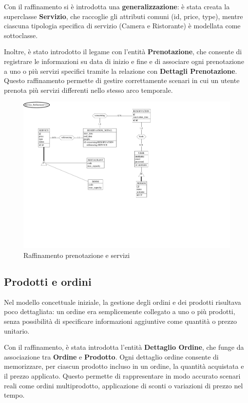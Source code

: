 \documentclass[a4paper,12pt]{report}
\begin{document}
\vspace{\baselineskip}
Con il raffinamento si è introdotta una \textbf{generalizzazione}: è stata creata la superclasse 
\textbf{Servizio}, che raccoglie gli attributi comuni (id, price, type), mentre ciascuna 
tipologia specifica di servizio (Camera e Ristorante) è modellata come sottoclasse.

\vspace{\baselineskip}
Inoltre, è stato introdotto il legame con l'entità \textbf{Prenotazione}, che consente di 
registrare le informazioni su data di inizio e fine e di associare ogni prenotazione a uno o 
più servizi specifici tramite la relazione con \textbf{Dettagli Prenotazione}. Questo
raffinamento permette di gestire correttamente scenari in cui un utente prenota più servizi 
differenti nello stesso arco temporale.
\begin{figure}[H]
	\centering
	\includegraphics[width=\textwidth, trim=0 200pt 300pt 0, clip]{./schemas/refinements/service.pdf}
	\caption{Raffinamento prenotazione e servizi}
	\label{fig:raffinamento-servizi-prenotazione}
\end{figure}

\newpage
\subsection{Prodotti e ordini}
Nel modello concettuale iniziale, la gestione degli ordini e dei prodotti risultava poco 
dettagliata: un ordine era semplicemente collegato a uno o più prodotti, senza possibilità di 
specificare informazioni aggiuntive come quantità o prezzo unitario.

\vspace{\baselineskip}
Con il raffinamento, è stata introdotta l'entità \textbf{Dettaglio Ordine}, che funge da 
associazione tra \textbf{Ordine} e \textbf{Prodotto}. Ogni dettaglio ordine consente di 
memorizzare, per ciascun prodotto incluso in un ordine, la quantità acquistata e il prezzo 
applicato. Questo permette di rappresentare in modo accurato scenari reali come ordini
multiprodotto, applicazione di sconti o variazioni di prezzo nel tempo.
\end{document}
